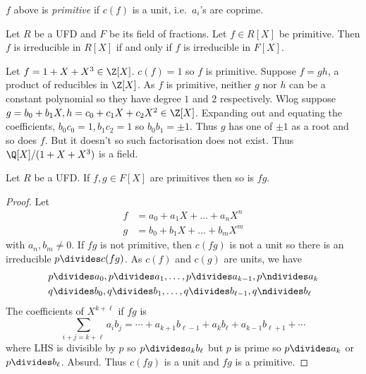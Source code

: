 \documentclass[a4paper]{article}
\theoremstyle{definition}
\begin{document}
\begin{definition}[Primitive]
  \(f\) above is \emph{primitive} if \(c(f)\) is a unit, i.e.\ \(a_i\)'s are coprime.
\end{definition}

\begin{theorem}
  \label{thm:Gauss' lemma}
  Let \(R\) be a UFD and \(F\) be its field of fractions. Let \(f \in R[X]\) be primitive. Then \(f\) is irreducible in \(R[X]\) if and only if \(f\) is irreducible in \(F[X]\).
\end{theorem}

\begin{eg}
  Let \(f = 1 + X + X^3 \in \Z[X]\). \(c(f) = 1\) so \(f\) is primitive. Suppose \(f = gh\), a product of reducibles in \(\Z[X]\). As \(f\) is primitive, neither \(g\) nor \(h\) can be a constant polynomial so they have degree \(1\) and \(2\) respectively. Wlog suppose \(g = b_0 + b_1X, h = c_0 + c_1X + c_2X^2 \in \Z[X]\). Expanding out and equating the coefficients, \(b_0c_0 = 1, b_1c_2 = 1\) so \(b_0b_1 = \pm 1\). Thus \(g\) has one of \(\pm 1\) as a root and so does \(f\). But it doesn't so such factorisation does not exist. Thus \(\Q[X]/(1 + X + X^3)\) is a field.
\end{eg}

\begin{lemma}
  Let \(R\) be a UFD. If \(f, g \in F[X]\) are primitives then so is \(fg\).
\end{lemma}

\begin{proof}
  Let
  \begin{align*}
    f &= a_0 + a_1X + \dots + a_nX^n \\
    g &= b_0 + b_1X + \dots + b_mX^m
  \end{align*}
  with \(a_n, b_m \neq 0\). If \(fg\) is not primitive, then \(c(fg)\) is not a unit so there is an irreducible \(p \divides c(fg)\). As \(c(f)\) and \(c(g)\) are units, we have
  \begin{align*}
    & p \divides a_0, p \divides a_1, \dots, p \divides a_{k - 1}, p \ndivides a_k \\
    & q \divides b_0, q \divides b_1, \dots, q \divides b_{\ell - 1}, q \ndivides b_\ell
  \end{align*}
  The coefficients of \(X^{k + \ell}\) if \(fg\) is
  \[
    \sum_{i + j = k + \ell} a_ib_j = \cdots + a_{k + 1}b_{\ell - 1} + a_kb_\ell + a_{k - 1}b_{\ell + 1} + \cdots
  \]
  where LHS is divisible by \(p\) so \(p \divides a_kb_\ell\) but \(p\) is prime so \(p \divides a_k\) or \(p \divides b_\ell\). Absurd. Thus \(c(fg)\) is a unit and \(fg\) is a primitive.
\end{proof}
\end{document}
